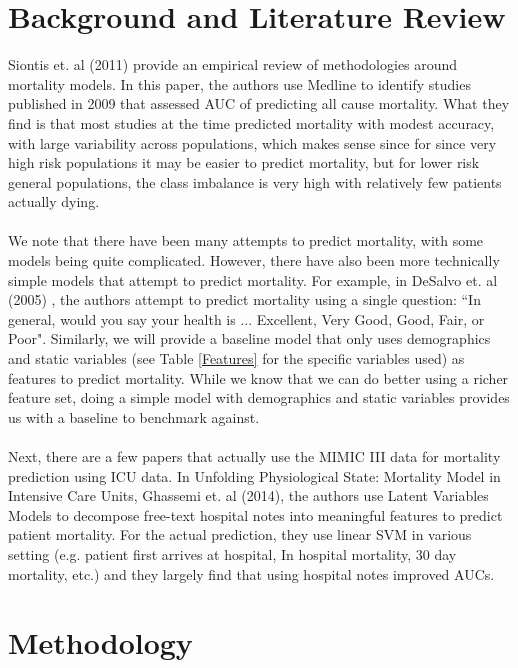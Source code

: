 \documentclass[12pt, final]{article}
\begin{document}
\section{Background and Literature Review}
\label{Background and Lit Review}
Siontis et. al (2011) \cite{Siontis} provide an empirical review of methodologies around mortality models. In this paper, the authors use Medline to identify studies published in 2009 that assessed AUC of predicting all cause mortality. What they find is that most studies at the time predicted mortality with modest accuracy, with large variability across populations, which makes sense since for since very high risk populations it may be easier to predict mortality, but for lower risk general populations, the class imbalance is very high with relatively few patients actually dying.
\\
\\
We note that there have been many attempts to predict mortality, with some models being quite complicated. However, there have also been more technically simple models that attempt to predict mortality. For example, in DeSalvo et. al (2005) \cite{DeSalvo}, the authors attempt to predict mortality using a single question: ``In general, would you say your health is ... Excellent, Very Good, Good, Fair, or Poor". Similarly, we will provide a baseline model that only uses demographics and static variables (see Table \ref{Features} for the specific variables used) as features to predict mortality. While we know that we can do better using a richer feature set, doing a simple model with demographics and static variables provides us with a baseline to benchmark against.
\\
\\
Next, there are a few papers that actually use the MIMIC III data for mortality prediction using ICU data. In Unfolding Physiological State: Mortality Model in Intensive Care Units, Ghassemi et. al (2014)\cite{Ghassemi}, the authors use Latent Variables Models to decompose free-text hospital notes into meaningful features to predict patient mortality. For the actual prediction, they use linear SVM in various setting (e.g. patient first arrives at hospital, In hospital mortality, 30 day mortality, etc.) and they largely find that using hospital notes improved AUCs.

\section{Methodology}
\label{Methodology}
\end{document}
